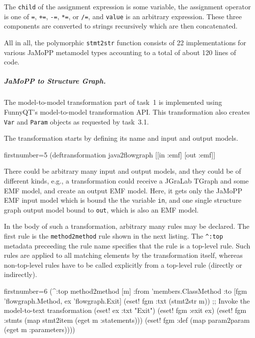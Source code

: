 \documentclass[submission]{eptcs}
\begin{document}
The \verb|child| of the assignment expression is some variable, the assignment
operator is one of \verb|=|, \verb|+=|, \verb|-=|, \verb|*=|, or \verb|/=|, and
\verb|value| is an arbitrary expression.  These three components are converted
to strings recursively which are then concatenated.

All in all, the polymorphic \verb|stmt2str| function consists of 22
implementations for various JaMoPP metamodel types accounting to a total of
about 120 lines of code.


\subparagraph{JaMoPP to Structure Graph.}
\label{sec:jamopp-struct-graph}

The model-to-model transformation part of task~1 is implemented using FunnyQT's
model-to-model transformation API.  This transformation also creates \verb|Var|
and \verb|Param| objects as requested by task~3.1.

The transformation starts by defining its name and input and output models.

\begin{clojurecode*}{firstnumber=5}
(deftransformation java2flowgraph [[in :emf] [out :emf]]
\end{clojurecode*}

There could be arbitrary many input and output models, and they could be of
different kinds, e.g., a transformation could receive a JGraLab TGraph and some
EMF model, and create an output EMF model.  Here, it gets only the JaMoPP EMF
input model which is bound the the variable \verb|in|, and one single structure
graph output model bound to \verb|out|, which is also an EMF model.

In the body of such a transformation, arbitrary many rules may be declared.
The first rule is the \verb|method2method| rule shown in the next listing.  The
\verb|^:top| metadata preceeding the rule name specifies that the rule is a
top-level rule.  Such rules are applied to all matching elements by the
transformation itself, whereas non-top-level rules have to be called explicitly
from a top-level rule (directly or indirectly).

\begin{clojurecode*}{firstnumber=6}
  (^:top method2method [m]
         :from 'members.ClassMethod
         :to [fgm 'flowgraph.Method, ex 'flowgraph.Exit]
         (eset! fgm :txt (stmt2str m)) ;; Invoke the model-to-text transformation
         (eset! ex :txt "Exit")
         (eset! fgm :exit ex)
         (eset! fgm :stmts (map stmt2item (eget m :statements)))
         (eset! fgm :def (map param2param (eget m :parameters))))
\end{clojurecode*}
\end{document}
